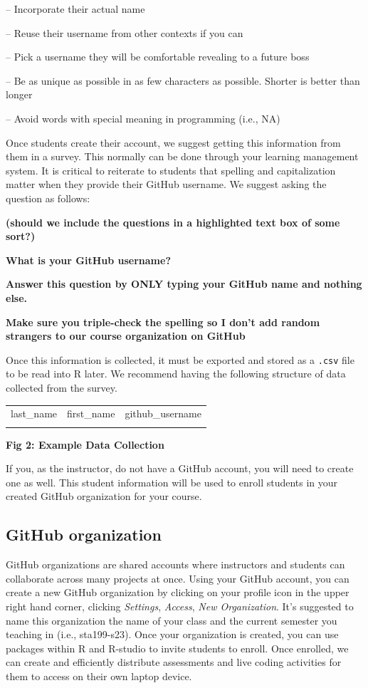 \documentclass[
  12pt]{article}
\begin{document}
-- Incorporate their actual name

-- Reuse their username from other contexts if you can

-- Pick a username they will be comfortable revealing to a future boss

-- Be as unique as possible in as few characters as possible. Shorter is
better than longer

-- Avoid words with special meaning in programming (i.e., NA)

Once students create their account, we suggest getting this information
from them in a survey. This normally can be done through your learning
management system. It is critical to reiterate to students that spelling
and capitalization matter when they provide their GitHub username. We
suggest asking the question as follows:

\textbf{(should we include the questions in a highlighted text box of
some sort?)}

\textbf{What is your GitHub username?}

\textbf{Answer this question by ONLY typing your GitHub name and nothing
else.}

\textbf{Make sure you triple-check the spelling so I don't add random
strangers to our course organization on GitHub}

Once this information is collected, it must be exported and stored as a
\texttt{.csv} file to be read into R later. We recommend having the
following structure of data collected from the survey.

\begin{longtable}[]{@{}lll@{}}
\toprule()
\endhead
last\_name & first\_name & github\_username \\
& & \\
\bottomrule()
\end{longtable}

\textbf{Fig 2: Example Data Collection}

If you, as the instructor, do not have a GitHub account, you will need
to create one as well. This student information will be used to enroll
students in your created GitHub organization for your course.

\hypertarget{github-organization}{%
\subsection{GitHub organization}\label{github-organization}}

GitHub organizations are shared accounts where instructors and students
can collaborate across many projects at once. Using your GitHub account,
you can create a new GitHub organization by clicking on your profile
icon in the upper right hand corner, clicking \emph{Settings},
\emph{Access}, \emph{New Organization}. It's suggested to name this
organization the name of your class and the current semester you
teaching in (i.e., sta199-s23). Once your organization is created, you
can use packages within R and R-studio to invite students to enroll.
Once enrolled, we can create and efficiently distribute assessments and
live coding activities for them to access on their own laptop device.
\end{document}
